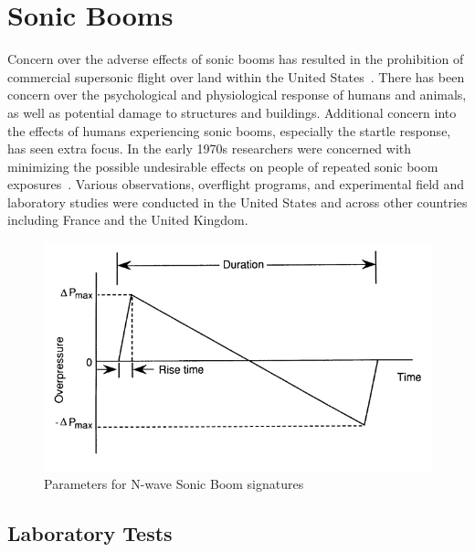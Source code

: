 \documentclass[]{aiaa-tc}%
\begin{document}
\section{Sonic Booms}
Concern over the adverse effects of sonic booms has resulted in the prohibition of commercial supersonic flight over land within the United States~\cite{ollerhead1971evaluation}. There has been concern over the psychological and physiological response of humans and animals, as well as potential damage to structures and buildings. Additional concern into the effects of humans experiencing sonic booms, especially the startle response, has seen extra focus. In the early 1970s researchers were concerned with minimizing the possible undesirable effects on people of repeated sonic boom exposures~\cite{von1972human}. Various observations, overflight programs, and experimental field and laboratory studies were conducted in the United States and across other countries including France and the United Kingdom.

\begin{figure}[tb!]
  \centering
  \includegraphics[width=\textwidth]{figs/n-wave.png}
  \caption{Parameters for N-wave Sonic Boom signatures~\cite{thackray1972sonic}}
  \label{fig:n-wave}
\end{figure}

\subsection{Laboratory Tests}
\end{document}
